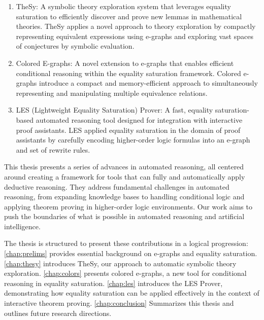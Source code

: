 \begin{enumerate}
    \item TheSy: A symbolic theory exploration system that leverages equality saturation to efficiently discover and prove new lemmas in mathematical theories. 
    TheSy applies a novel approach to theory exploration by compactly representing equivalent expressions using e-graphs and exploring vast spaces of conjectures by symbolic evaluation.
    \item Colored E-graphs: A novel extension to e-graphs that enables efficient conditional reasoning within the equality saturation framework. 
    Colored e-graphs introduce a compact and memory-efficient approach to simultaneously representing and manipulating multiple equivalence relations.
    \item LES (Lightweight Equality Saturation) Prover: A fast, equality saturation-based automated reasoning tool designed for integration with interactive proof assistants. 
    LES applied equality saturation in the domain of proof assistants by carefully encoding higher-order logic formulas into an e-graph and set of rewrite rules.
\end{enumerate}

This thesis presents a series of advances in automated reasoning, all centered around creating a framework for tools that can fully and automatically apply deductive reasoning.
They address fundamental challenges in automated reasoning, from expanding knowledge bases to handling conditional logic and applying theorem proving in higher-order logic environments.
Our work aims to push the boundaries of what is possible in automated reasoning and artificial intelligence.

The thesis is structured to present these contributions in a logical progression:
\autoref{chap:prelims} provides essential background on e-graphs and equality saturation.
\autoref{chap:thesy} introduces TheSy, our approach to automatic symbolic theory exploration.
\autoref{chap:colors} presents colored e-graphs, a new tool for conditional reasoning in equality saturation.
\autoref{chap:les} introduces the LES Prover, demonstrating how equality saturation can be applied effectively in the context of interactive theorem proving.
\autoref{chap:conclusion} Summarizes this thesis and outlines future research directions.

